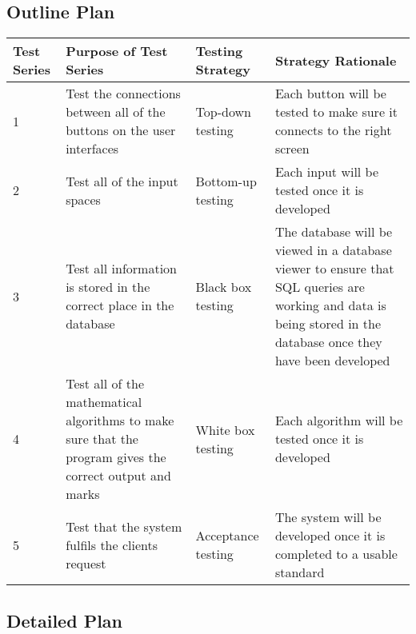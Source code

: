 \begin{landscape}
\subsection{Outline Plan}

\begin{center}
    \begin{tabular}{|p{2cm}|p{5cm}|p{5cm}|p{4cm}|}
        \hline
        \textbf{Test Series} & \textbf{Purpose of Test Series} & \textbf{Testing Strategy} & \textbf{Strategy Rationale}\\ \hline
        1 & Test the connections between all of the buttons on the user interfaces & Top-down testing & Each button will be tested to make sure it connects to the right screen \\ \hline
        2 & Test all of the input spaces & Bottom-up testing & Each input will be tested once it is developed \\ \hline
        3 & Test all information is stored in the correct place in the database & Black box testing & The database will be viewed in a database viewer to ensure that SQL queries are working and data is being stored in the database once they have been developed \\ \hline
	4 & Test all of the mathematical algorithms to make sure that the program gives the correct output and marks & White box testing & Each algorithm will be tested once it is developed \\ \hline
	5 & Test that the system fulfils the clients request & Acceptance testing & The system will be developed once it is completed to a usable standard \\ \hline
    \end{tabular}
\end{center}

\subsection{Detailed Plan}


\end{landscape}
